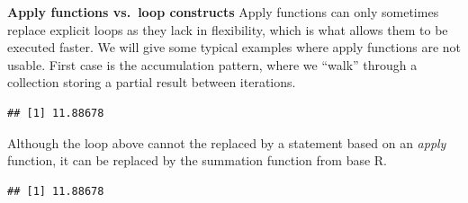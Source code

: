 \documentclass[krantz2]{krantz}\usepackage{knitr}%
\begin{document}
\begin{explainbox}
\textbf{Apply functions vs.\ loop constructs} Apply functions can only sometimes replace explicit loops as they lack in flexibility, which is what allows them to be executed faster. We will give some typical examples where apply functions are not usable. First case is the accumulation pattern, where we ``walk'' through a collection storing a partial result between iterations.

\begin{knitrout}\footnotesize
{}\color{fgcolor}\begin{kframe}
\begin{alltt}
\hlstd{(}\hlstd{)}
 \hlkwb{<-} \hlstd{(}\hlstd{)}
 \hlkwb{<-} 
   \hlstd{(} 
   \hlkwb{<-}  \hlopt{+} 
  \hlstd{\}}
\end{alltt}
\begin{verbatim}
## [1] 11.88678
\end{verbatim}
\end{kframe}
\end{knitrout}

Although the loop above cannot the replaced by a statement based on an \emph{apply} function, it can be replaced by the summation function  from base R.
\begin{knitrout}\footnotesize
{}\color{fgcolor}\begin{kframe}
\begin{alltt}
\hlstd{(}\hlstd{)}
 \hlkwb{<-} \hlstd{(}\hlstd{)}
 \hlkwb{<-} 
\end{alltt}
\begin{verbatim}
## [1] 11.88678
\end{verbatim}
\end{kframe}
\end{knitrout}


\end{explainbox}
\end{document}
